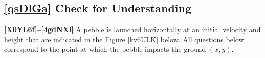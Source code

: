 \documentclass[main-physics.tex]{subfiles}
\begin{document}













\subsection*{\ref{qsDlGa} Check for Understanding}

\textbf{\ref{X0YL6f}--\ref{4gdNXl}} A pebble is launched horizontally at an initial velocity and height that are indicated in the Figure \ref{kv6ULK} below. All questions below correspond to the point at which the pebble impacts the ground $(x,y)$.
\end{document}
